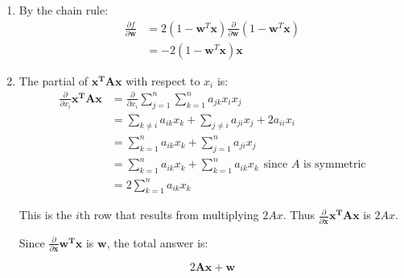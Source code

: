 \documentclass{harvardml}
\theoremstyle{definition}
\theoremstyle{plain}
\begin{document}
\begin{problem}
\begin{enumerate} [label=(\alph*)]
		        \item By the chain rule: \begin{align*}
		            \frac{\partial f}{\partial \mathbf{w}} &= 2(1-\mathbf{w}^T\mathbf{x}) \frac{\partial}{\partial \mathbf{w}} (1-\mathbf{w}^T\mathbf{x}) \\
		            &= -2(1-\mathbf{w}^T\mathbf{x})\mathbf{x}
		        \end{align*}
		        
		        \item The partial of $\mathbf{x^TAx}$ with respect to $x_i$ is: \begin{align*}
		            \frac{\partial}{\partial x_i} \mathbf{x^TAx} &= \frac{\partial}{\partial x_i} \sum_{j=1}^n \sum_{k=1}^n a_{jk} x_i x_j \\
		            &= \sum_{k\neq i}a_{ik} x_k +  \sum_{j\neq i}a_{ji}x_j + 2a_{ii}x_i \\ 
		            &= \sum_{k=1}^n a_{ik} x_k + \sum_{j=1}^n a_{ji} x_j \\
		            &= \sum_{k=1}^n a_{ik} x_k + \sum_{k=1}^n a_{ik} x_k \hspace{5pt} \text{since $A$ is symmetric}\\
		            &= 2\sum_{k=1}^n a_{ik} x_k
		        \end{align*}
		        
		        This is the $i$th row that results from multiplying $2Ax$. Thus $\frac{\partial}{\partial \mathbf{x}} \mathbf{x^TAx}$ is $2Ax$.
		        
		        Since $\frac{\partial}{\partial \mathbf{x}}\mathbf{w^Tx}$ is $\mathbf{w}$, the total answer is:
		        
		        \begin{equation}
		            2\mathbf{A}\mathbf{x} + \mathbf{w}
		        \end{equation}
		       
		    \end{enumerate}
 		    
		\end{problem}
        
\end{document}
